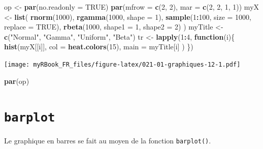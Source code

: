 \documentclass[]{book}
\newenvironment{Shaded}{\begin{snugshade}}{\end{snugshade}}
\newcommand{\ControlFlowTok}[1]{\textcolor[rgb]{0.13,0.29,0.53}{\textbf{#1}}}
\newcommand{\DataTypeTok}[1]{\textcolor[rgb]{0.13,0.29,0.53}{#1}}
\newcommand{\DecValTok}[1]{\textcolor[rgb]{0.00,0.00,0.81}{#1}}
\newcommand{\KeywordTok}[1]{\textcolor[rgb]{0.13,0.29,0.53}{\textbf{#1}}}
\newcommand{\NormalTok}[1]{#1}
\newcommand{\OperatorTok}[1]{\textcolor[rgb]{0.81,0.36,0.00}{\textbf{#1}}}
\newcommand{\OtherTok}[1]{\textcolor[rgb]{0.56,0.35,0.01}{#1}}
\newcommand{\StringTok}[1]{\textcolor[rgb]{0.31,0.60,0.02}{#1}}
\begin{document}
\begin{Shaded}
\begin{Highlighting}[]
\NormalTok{op <-}\StringTok{ }\KeywordTok{par}\NormalTok{(}\DataTypeTok{no.readonly =} \OtherTok{TRUE}\NormalTok{)}
\KeywordTok{par}\NormalTok{(}\DataTypeTok{mfrow =} \KeywordTok{c}\NormalTok{(}\DecValTok{2}\NormalTok{, }\DecValTok{2}\NormalTok{), }\DataTypeTok{mar =} \KeywordTok{c}\NormalTok{(}\DecValTok{2}\NormalTok{, }\DecValTok{2}\NormalTok{, }\DecValTok{1}\NormalTok{, }\DecValTok{1}\NormalTok{))}
\NormalTok{myX <-}\StringTok{ }\KeywordTok{list}\NormalTok{(}
  \KeywordTok{rnorm}\NormalTok{(}\DecValTok{1000}\NormalTok{),}
  \KeywordTok{rgamma}\NormalTok{(}\DecValTok{1000}\NormalTok{, }\DataTypeTok{shape =} \DecValTok{1}\NormalTok{),}
  \KeywordTok{sample}\NormalTok{(}\DecValTok{1}\OperatorTok{:}\DecValTok{100}\NormalTok{, }\DataTypeTok{size =} \DecValTok{1000}\NormalTok{, }\DataTypeTok{replace =} \OtherTok{TRUE}\NormalTok{),}
  \KeywordTok{rbeta}\NormalTok{(}\DecValTok{1000}\NormalTok{, }\DataTypeTok{shape1 =} \DecValTok{1}\NormalTok{, }\DataTypeTok{shape2 =} \DecValTok{2}\NormalTok{)}
\NormalTok{)}
\NormalTok{myTitle <-}\StringTok{ }\KeywordTok{c}\NormalTok{(}\StringTok{"Normal"}\NormalTok{, }\StringTok{"Gamma"}\NormalTok{, }\StringTok{"Uniform"}\NormalTok{, }\StringTok{"Beta"}\NormalTok{)}
\NormalTok{tr <-}\StringTok{ }\KeywordTok{lapply}\NormalTok{(}\DecValTok{1}\OperatorTok{:}\DecValTok{4}\NormalTok{, }\ControlFlowTok{function}\NormalTok{(i)\{}
  \KeywordTok{hist}\NormalTok{(myX[[i]], }
    \DataTypeTok{col =} \KeywordTok{heat.colors}\NormalTok{(}\DecValTok{15}\NormalTok{), }
    \DataTypeTok{main =}\NormalTok{ myTitle[i]}
\NormalTok{  )}
\NormalTok{\})}
\end{Highlighting}
\end{Shaded}

\texttt{[image: myRBook\_FR\_files/figure-latex/021-01-graphiques-12-1.pdf]}

\begin{Shaded}
\begin{Highlighting}[]
\KeywordTok{par}\NormalTok{(op)}
\end{Highlighting}
\end{Shaded}

\hypertarget{graph1barplot}{%
\section{\texorpdfstring{\texttt{barplot}}{barplot}}\label{graph1barplot}}

Le graphique en barres se fait au moyen de la fonction \texttt{barplot()}.
\end{document}
